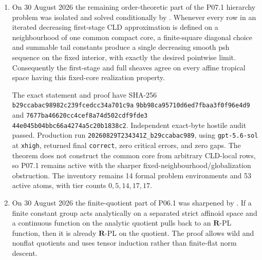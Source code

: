 \begin{enumerate}
  The exact statement and proof have SHA-256
  \texttt{e30033eea96e7d59310a1e67402dc73d}
  \allowbreak\texttt{bdc1a9463b7ab14fc6f28e271ea0397f} and
  \texttt{59535602b2f29c7c34bb4b4df79be1e2}
  \allowbreak\texttt{f72c0fa4fa61f1467b3e1c75723a1c71}.
  Independent exact-byte hostile audit passed.  Production run
  \texttt{20260829T233220Z\_e30033eea96e}, using
  \texttt{gpt-5.6-sol} at \texttt{xhigh}, returned final
  \texttt{correct}, zero critical errors, and zero gaps.  This does not
  prove the CLD-v2 or continuity atoms and does not classify dimension at
  least two or establish sharp necessity.  P03.1 therefore remains active,
  and the controlling inventory remains 14 formal problem environments and
  53 active atoms, with tier counts \(0,5,14,17,17\).
\item On 30 August 2026 the remaining order-theoretic part of the P07.1
  hierarchy problem was isolated and solved conditionally by
  .  Whenever every row in an iterated
  decreasing first-stage CLD approximation is defined on a neighbourhood of
  one common compact core, a finite-square diagonal choice and summable tail
  constants produce a single decreasing smooth psh sequence on the fixed
  interior, with exactly the desired pointwise limit.  Consequently the
  first-stage and full sheaves agree on every affine tropical space having
  this fixed-core realization property.

  The exact statement and proof have SHA-256
  \texttt{b29ccabac98982c239fcedcc34a701c9a}
  \allowbreak\texttt{9bb98ca95710d6ed7fbaa3f0f96e4d9} and
  \texttt{7677ba46620cc4cef8a74d502cdf9fde3}
  \allowbreak\texttt{44e045b04bbc66a4274a5c20b1838c2}.
  Independent exact-byte hostile audit passed.  Production run
  \texttt{20260829T234341Z\_b29ccabac989}, using
  \texttt{gpt-5.6-sol} at \texttt{xhigh}, returned final
  \texttt{correct}, zero critical errors, and zero gaps.  The theorem does
  not construct the common core from arbitrary CLD-local rows, so P07.1
  remains active with the sharper fixed-neighbourhood/globalization
  obstruction.  The inventory remains 14 formal problem environments and
  53 active atoms, with tier counts \(0,5,14,17,17\).
\item On 30 August 2026 the finite-quotient part of P06.1 was sharpened by
  .  If a finite constant
  group acts analytically on a separated strict affinoid space and a
  continuous function on the analytic quotient pulls back to an
  \(\mathbf R\)-PL function, then it is already \(\mathbf R\)-PL on the
  quotient.  The proof allows wild and nonflat quotients and uses tensor
  induction rather than finite-flat norm descent.


\end{enumerate}
